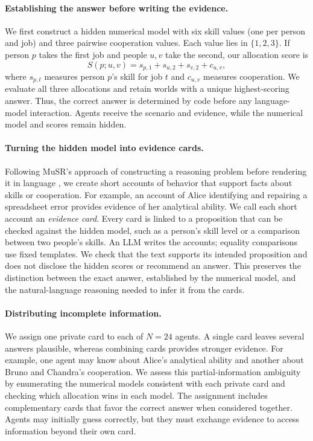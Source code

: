 \paragraph{Establishing the answer before writing the evidence.}
We first construct a hidden numerical model with six skill values (one per
person and job) and three pairwise cooperation values. Each value lies in
$\{1,2,3\}$. If person $p$ takes the first job and people $u,v$ take the second,
our allocation score is
\begin{equation}
    S(p;u,v)=s_{p,1}+s_{u,2}+s_{v,2}+c_{u,v},
\end{equation}
where $s_{p,t}$ measures person $p$'s skill for job $t$ and $c_{u,v}$ measures
cooperation. We evaluate all three allocations and retain worlds with a unique
highest-scoring answer. Thus, the correct answer is determined by code before
any language-model interaction. Agents receive the scenario and evidence,
while the numerical model and scores remain hidden.

\paragraph{Turning the hidden model into evidence cards.}
Following MuSR's approach of constructing a reasoning problem before rendering
it in language \citep{sprague2024musr}, we create short accounts of behavior
that support facts about skills or cooperation. For example, an account of
Alice identifying and repairing a spreadsheet error provides evidence of her
analytical ability. We call each short account an \emph{evidence card}.
Every card is linked to a proposition that can be checked against the hidden
model, such as a person's skill level or a comparison between two people's
skills. An LLM writes the accounts; equality comparisons use fixed templates.
We check that the text supports its intended proposition and does not disclose
the hidden scores or recommend an answer. This preserves the distinction
between the exact answer, established by the numerical model, and the
natural-language reasoning needed to infer it from the cards.

\paragraph{Distributing incomplete information.}
We assign one private card to each of $N=24$ agents. A single card leaves
several answers plausible, whereas combining cards provides stronger evidence.
For example, one agent may know about Alice's analytical ability and another
about Bruno and Chandra's cooperation. We assess this partial-information
ambiguity by enumerating the numerical models consistent with each private
card and checking which allocation wins in each model. The assignment includes
complementary cards that favor the correct answer when considered together.
Agents may initially guess correctly, but they must exchange evidence to
access information beyond their own card.

